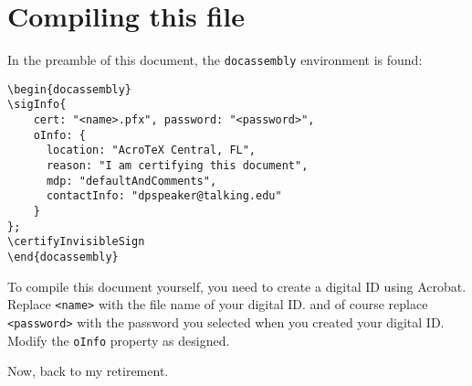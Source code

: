 \documentclass[12pt]{article}
\begin{document}
\section{Compiling this file}

In the preamble of this document, the \texttt{docassembly} environment is found:
\begin{Verbatim}[xleftmargin=20pt,fontsize=\small]
\begin{docassembly}
\sigInfo{
    cert: "<name>.pfx", password: "<password>",
    oInfo: {
      location: "AcroTeX Central, FL",
      reason: "I am certifying this document",
      mdp: "defaultAndComments",
      contactInfo: "dpspeaker@talking.edu"
    }
};
\certifyInvisibleSign
\end{docassembly}
\end{Verbatim}
To compile this document yourself, you need to create a digital ID using
\textsf{Acrobat}. Replace \texttt{<name>} with the file name of your digital
ID. and of course replace \texttt{<password>} with the password you selected
when you created your digital ID. Modify the \texttt{oInfo} property as
designed.


Now, back to my retirement.
\end{document}
